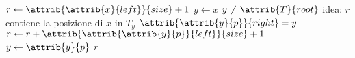 \begin{codebox}
\li $r \gets \attrib{\attrib{x}{left}}{size} + 1$
\li $y \gets x$
\li \While $y \neq \attrib{T}{root}$
    \Comment idea: $r$ contiene la posizione di $x$ in $T_y$
\li \Do
        \If $\attrib{\attrib{y}{p}}{right} = y$
\li     \Then
            $r \gets r + \attrib{\attrib{\attrib{y}{p}}{left}}{size} + 1$
        \End
\li     $y \gets \attrib{y}{p}$
    \End
\li \Return $r$
\end{codebox}